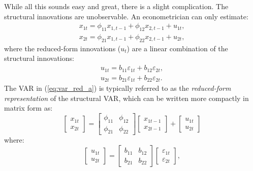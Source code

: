 \documentclass[10pt]{article}
\begin{document}
While all this sounds easy and great, there is a slight complication. The
structural innovations are unobservable. An econometrician can only estimate:%
\begin{equation}
\begin{array}{c}
x_{1t}=\phi _{11}x_{1,t-1}+\phi _{12}x_{2,t-1}+u_{1t}, \\ 
x_{2t}=\phi _{21}x_{1,t-1}+\phi _{22}x_{2,t-1}+u_{2t},%
\end{array}
\label{eq:red_var_1}
\end{equation}%
where the reduced-form innovations ($u_{t}$) are a linear combination of the
structural innovations:%
\begin{equation}
\begin{array}{c}
u_{1t}=b_{11}\varepsilon _{1t}+b_{12}\varepsilon _{2t}, \\ 
u_{2t}=b_{21}\varepsilon _{1t}+b_{22}\varepsilon _{2t}.%
\end{array}
\label{eq:red_resid_1}
\end{equation}%
The VAR in (\ref{eq:var_red_a}) is typically referred to as the \emph{%
reduced-form representation} of the structural VAR, which can be written
more compactly in matrix form as:%
\begin{equation}
\left[ 
\begin{array}{c}
x_{1t} \\ 
x_{2t}%
\end{array}%
\right] =%
\begin{bmatrix}
\phi _{11} & \phi _{12} \\ 
\phi _{21} & \phi _{22}%
\end{bmatrix}%
\left[ 
\begin{array}{c}
x_{1t-1} \\ 
x_{2t-1}%
\end{array}%
\right] +\left[ 
\begin{array}{c}
u_{1t} \\ 
u_{2t}%
\end{array}%
\right]  \label{eq:red_var_2}
\end{equation}%
where:%
\begin{equation}
\left[ 
\begin{array}{c}
u_{1t} \\ 
u_{2t}%
\end{array}%
\right] =%
\begin{bmatrix}
b_{11} & b_{12} \\ 
b_{21} & b_{22}%
\end{bmatrix}%
\begin{bmatrix}
\varepsilon _{1t} \\ 
\varepsilon _{2t}%
\end{bmatrix}%
,  \label{eq:red_resid_2}
\end{equation}%
\end{document}
